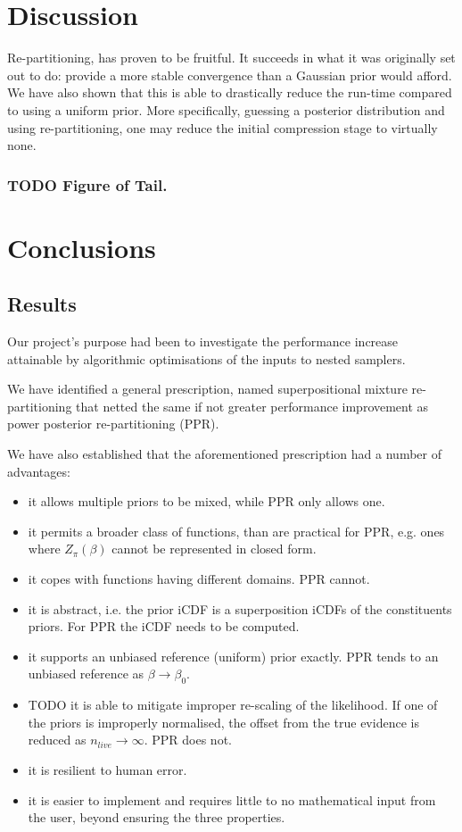\documentclass[usenatbib]{mnras}
\begin{document}
\section{Discussion}
\label{sec:orge848907}

Re-partitioning, has proven to be fruitful. It succeeds in what it
was originally set out to do: provide a more stable convergence
than a Gaussian prior would afford. We have also shown that this
is able to drastically reduce the run-time compared to using a
uniform prior. More specifically, guessing a posterior
distribution and using re-partitioning, one may reduce the initial
compression stage to virtually none. 

\subsubsection{{\bfseries\sffamily TODO} Figure of Tail.}
\label{sec:org63e3835}


\section{Conclusions}
\label{sec:org74de9e3}

\subsection{Results}
\label{sec:orgbb7ec93}
Our project's purpose had been to investigate the performance
increase attainable by algorithmic optimisations of the inputs to
nested samplers. 

We have identified a general prescription, named superpositional
mixture re-partitioning that netted the same if not greater
performance improvement as power posterior re-partitioning (PPR). 

We have also established that the aforementioned prescription had a
number of advantages:
\begin{itemize}
\item it allows multiple priors to be mixed, while PPR only allows one.
\item it permits a broader class of functions, than are practical for
PPR, e.g. ones where \(Z_{\pi}(\beta)\) cannot be represented in
closed form.
\item it copes with functions having different domains. PPR cannot.
\item it is abstract, i.e. the prior iCDF is a superposition iCDFs of
the constituents priors. For PPR the iCDF needs to be computed.
\item it supports an unbiased reference (uniform) prior exactly. PPR
tends to an unbiased reference as \(\beta\rightarrow\beta_{0}\).
\item TODO it is able to mitigate improper re-scaling of the
likelihood. If one of the priors is improperly normalised, the
offset from the true evidence is reduced as
\(n_{live}\rightarrow\infty\). PPR does not.
\item it is resilient to human error.
\item it is easier to implement and requires little to no mathematical
input from the user, beyond ensuring the three properties.
\end{itemize}
\end{document}
